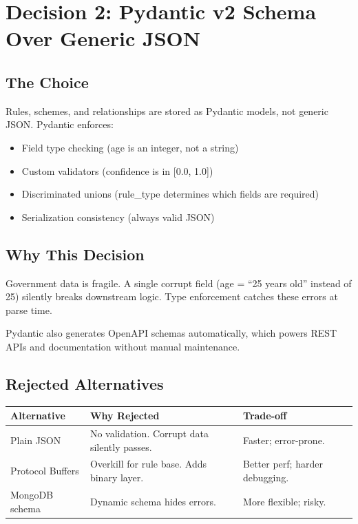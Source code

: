 \documentclass[11pt,a4paper]{report}
\begin{document}
\section{Decision 2: Pydantic v2 Schema Over Generic JSON}

\subsection{The Choice}

Rules, schemes, and relationships are stored as Pydantic models, not generic JSON. Pydantic enforces:

\begin{itemize}
  \item Field type checking (age is an integer, not a string)
  \item Custom validators (confidence is in [0.0, 1.0])
  \item Discriminated unions (rule\_type determines which fields are required)
  \item Serialization consistency (always valid JSON)
\end{itemize}

\subsection{Why This Decision}

Government data is fragile. A single corrupt field (age = ``25 years old'' instead of 25) silently breaks downstream logic. Type enforcement catches these errors at parse time. 

Pydantic also generates OpenAPI schemas automatically, which powers REST APIs and documentation without manual maintenance.

\subsection{Rejected Alternatives}

\begin{table}[H]
\centering
\small
\begin{tabular}{p{2cm}p{4cm}p{3cm}}
\toprule
Alternative & Why Rejected & Trade-off \\
\midrule
Plain JSON & No validation. Corrupt data silently passes. & Faster; error-prone. \\
Protocol Buffers & Overkill for rule base. Adds binary layer. & Better perf; harder debugging. \\
MongoDB schema & Dynamic schema hides errors. & More flexible; risky. \\
\bottomrule
\end{tabular}
\end{table}
\end{document}

